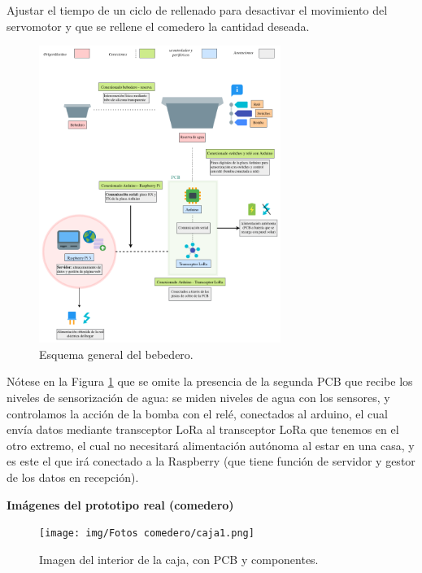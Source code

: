 \documentclass[12pt]{article}
\begin{document}
	\noindent Ajustar el tiempo de un ciclo de rellenado para desactivar el movimiento del servomotor y que se rellene el comedero la cantidad deseada. \\
	
	\pagebreak
	
		\begin{figure}[h]
		\begin{center}
			\includegraphics[width=0.7\textwidth]{img/conexiones tfg-bebedero.png}
			\caption{Esquema general del bebedero. }
			\label{Conexiones TFG bebedero.}
		\end{center}
	\end{figure}
	
	\noindent Nótese en la Figura \ref{Conexiones TFG bebedero.} que se omite la presencia de la segunda PCB que recibe los niveles de sensorización de agua: se miden niveles de agua con los sensores, y controlamos la acción de la bomba con el relé, conectados al arduino, el cual envía datos mediante transceptor LoRa al transceptor LoRa que tenemos en el otro extremo, el cual no necesitará alimentación autónoma al estar en una casa, y es este el que irá conectado a la Raspberry (que tiene función de servidor y gestor de los datos en recepción). \\
	
	\pagebreak
	
	\noindent \textbf{Imágenes del prototipo real (comedero)} \\
	
	\begin{figure}[h]
		\begin{center}
			\texttt{[image: img/Fotos comedero/caja1.png]}
			\caption{Imagen del interior de la caja, con PCB y componentes. }
			\label{Prototipo: caja1}
		\end{center}
	\end{figure}
	
\end{document}
